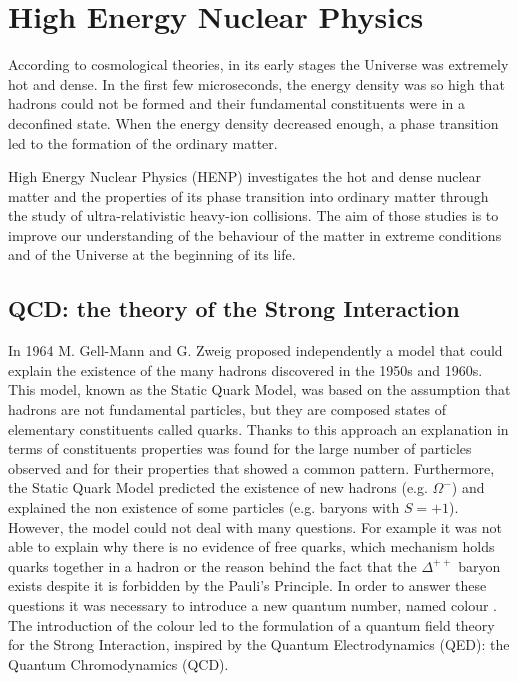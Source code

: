 %
\chapter{High Energy Nuclear Physics}
\label{sec:1}


According to cosmological theories, in its early stages the Universe was extremely hot and dense. 
In the first few microseconds, the energy density was so high that hadrons could not be formed and
their fundamental constituents were in a deconfined state. When the energy density decreased enough, a phase transition led to the formation of the ordinary matter. 

High Energy Nuclear Physics (HENP) investigates the hot and dense nuclear matter and the properties
of its phase transition into ordinary matter through the study of ultra-relativistic heavy-ion collisions. 
The aim of those studies is to improve our understanding of the behaviour of the matter in extreme
conditions and of the Universe at the beginning of its life.

\section{QCD: the theory of the Strong Interaction}
\label{sec:1.1}

In 1964 M. Gell-Mann \cite{gellmann} and G. Zweig \cite{zweig1, zweig2} proposed independently a model that could explain the existence of
the many hadrons discovered in the 1950s and 1960s. 
This model, known as the Static Quark Model, was based on the assumption that hadrons are not
fundamental particles, but they are composed states of elementary constituents called quarks.
Thanks to this approach an explanation in terms of constituents properties was found for the large number 
of particles observed and for their properties that showed a common pattern.
Furthermore, the Static Quark Model predicted the existence of new hadrons (e.g. 
$\Omega^{-}\xspace$) and explained the non existence of some particles (e.g. baryons with $S=+1$).
However, the model could not deal with many questions. For example it was not able to explain why there
is no evidence of free quarks, which mechanism holds quarks together in a hadron or the reason behind the
fact that the $\Delta^{++}$ baryon exists despite it is forbidden by the Pauli's Principle.
In order to answer these questions it was necessary to introduce a new quantum number, named colour
\cite{fritzsch-gellmann}. The introduction of the colour led to the formulation of a quantum field theory
for the Strong Interaction, inspired by the Quantum Electrodynamics (QED): the Quantum Chromodynamics
(QCD).

